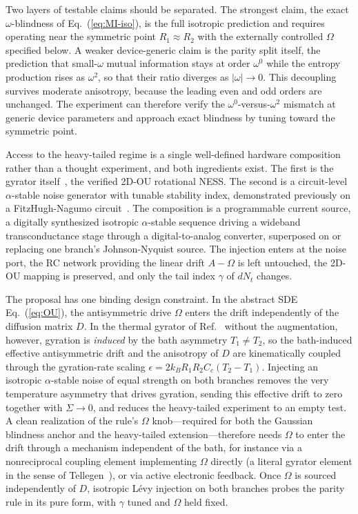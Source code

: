\documentclass[%
 reprint,
 superscriptaddress,
 nofootinbib,
 nobibnotes,
 amsmath,amssymb,
 aps,
 prl,
 floatfix,
]{revtex4-2}
\begin{document}
Two layers of testable claims should be separated. The strongest claim, the exact $\omega$-blindness of Eq.~(\ref{eq:MI-iso}), is the full isotropic prediction and requires operating near the symmetric point $R_1 \approx R_2$ with the externally controlled $\Omega$ specified below. A weaker device-generic claim is the parity split itself, the prediction that small-$\omega$ mutual information stays at order $\omega^0$ while the entropy production rises as $\omega^2$, so that their ratio diverges as $|\omega| \to 0$. This decoupling survives moderate anisotropy, because the leading even and odd orders are unchanged. The experiment can therefore verify the $\omega^0$-versus-$\omega^2$ mismatch at generic device parameters and approach exact blindness by tuning toward the symmetric point.

Access to the heavy-tailed regime is a single well-defined hardware composition rather than a thought experiment, and both ingredients exist. The first is the gyrator itself~\cite{Chiang2017}, the verified 2D-OU rotational NESS. The second is a circuit-level $\alpha$-stable noise generator with tunable stability index, demonstrated previously on a FitzHugh-Nagumo circuit~\cite{LevyCircuit2024}. The composition is a programmable current source, a digitally synthesized isotropic $\alpha$-stable sequence driving a wideband transconductance stage through a digital-to-analog converter, superposed on or replacing one branch's Johnson-Nyquist source. The injection enters at the noise port, the RC network providing the linear drift $A - \Omega$ is left untouched, the 2D-OU mapping is preserved, and only the tail index $\gamma$ of $dN_t$ changes.

The proposal has one binding design constraint. In the abstract SDE Eq.~(\ref{eq:OU}), the antisymmetric drive $\Omega$ enters the drift independently of the diffusion matrix $D$. In the thermal gyrator of Ref.~\cite{Chiang2017} without the augmentation, however, gyration is \emph{induced} by the bath asymmetry $T_1 \neq T_2$, so the bath-induced effective antisymmetric drift and the anisotropy of $D$ are kinematically coupled through the gyration-rate scaling $\epsilon = 2 k_B R_1 R_2 C_c (T_2 - T_1)$. Injecting an isotropic $\alpha$-stable noise of equal strength on both branches removes the very temperature asymmetry that drives gyration, sending this effective drift to zero together with $\Sigma \to 0$, and reduces the heavy-tailed experiment to an empty test. A clean realization of the rule's $\Omega$ knob---required for both the Gaussian blindness anchor and the heavy-tailed extension---therefore needs $\Omega$ to enter the drift through a mechanism independent of the bath, for instance via a nonreciprocal coupling element implementing $\Omega$ directly (a literal gyrator element in the sense of Tellegen~\cite{Tellegen1948}), or via active electronic feedback. Once $\Omega$ is sourced independently of $D$, isotropic L\'evy injection on both branches probes the parity rule in its pure form, with $\gamma$ tuned and $\Omega$ held fixed.
\end{document}
